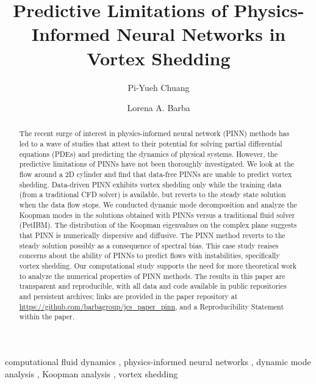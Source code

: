 \documentclass[5p, twocolumn, times, sort&compress]{elsarticle}
\begin{document}
    \begin{frontmatter}
        \title{%
        Predictive Limitations of Physics-Informed Neural Networks in Vortex Shedding%
        }

        \author[1]{Pi-Yueh Chuang}
        \author[1]{Lorena A. Barba}

        \begin{abstract}
            The recent surge of interest in physics-informed neural network (PINN) methods has led to a wave of studies that attest to their potential for solving partial differential equations (PDEs) and predicting the dynamics of physical systems. However, the predictive limitations of PINNs have not been thoroughly investigated. We look at the flow around a 2D cylinder and find that data-free PINNs are unable to predict vortex shedding. Data-driven PINN exhibits vortex shedding only while the training data (from a traditional CFD solver) is available, but reverts to the steady state solution when the data flow stops. We conducted dynamic mode decomposition and analyze the Koopman modes in the solutions obtained with PINNs versus a traditional fluid solver (PetIBM). The distribution of the Koopman eigenvalues on the complex plane suggests that PINN is numerically dispersive and diffusive. The PINN method  reverts to the steady solution possibly as a consequence of spectral bias. This case study reaises concerns about the ability of PINNs to predict flows with instabilities, specifically vortex shedding. Our computational study supports the need for more theoretical work to analyze the numerical properties of PINN methods. The results in this paper are transparent and reproducible, with all data and code available in public repositories and persistent archives; links are provided in the paper repository at \url{https://github.com/barbagroup/jcs_paper_pinn}, and a Reproducibility Statement within the paper.
        \end{abstract}

        \begin{keyword}
            computational fluid dynamics \sep
            physics-informed neural networks \sep
            dynamic mode analysis \sep
            Koopman analysis \sep
            vortex shedding
        \end{keyword}
    \end{frontmatter}
\end{document}
